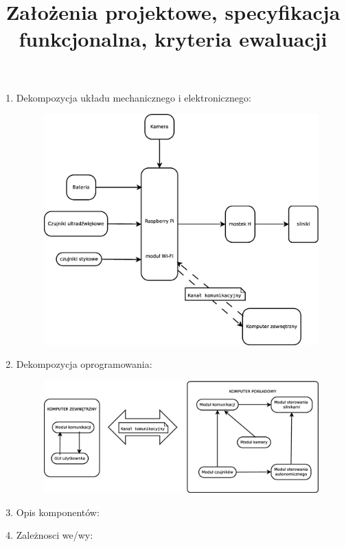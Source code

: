 \documentclass[a4paper]{article}
\title{Założenia projektowe, specyfikacja funkcjonalna, kryteria ewaluacji}
\date{}
\author{}
\begin{document}
\maketitle

\begin{enumerate}

\item Dekompozycja układu mechanicznego i elektronicznego:
\begin{figure}[H]
\centering
\includegraphics[width=15cm]{idea_sprzet-mech.eps}
\end{figure}

\item Dekompozycja oprogramowania:
\begin{figure}[H]
\centering
\includegraphics[width=15cm]{idea_programowa.eps}
\end{figure}

\item Opis komponentów:

\item Zależnosci we/wy:


\end{enumerate}
\end{document}
